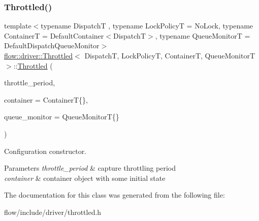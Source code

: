 \subsubsection{\texorpdfstring{Throttled()}{Throttled()}}
{\footnotesize\ttfamily template$<$typename DispatchT , typename Lock\+PolicyT  = No\+Lock, typename ContainerT  = Default\+Container$<$\+Dispatch\+T$>$, typename Queue\+MonitorT  = Default\+Dispatch\+Queue\+Monitor$>$ \\
\hyperlink{classflow_1_1driver_1_1_throttled}{flow\+::driver\+::\+Throttled}$<$ DispatchT, Lock\+PolicyT, ContainerT, Queue\+MonitorT $>$\+::\hyperlink{classflow_1_1driver_1_1_throttled}{Throttled} (\begin{DoxyParamCaption}\item[{const \hyperlink{classflow_1_1driver_1_1_throttled_abceda047ac43fa03ddfe00b68317ae3d}{offset\+\_\+type}}]{throttle\+\_\+period,  }\item[{const ContainerT \&}]{container = {\ttfamily ContainerT\{\}},  }\item[{const Queue\+MonitorT \&}]{queue\+\_\+monitor = {\ttfamily QueueMonitorT\{\}} }\end{DoxyParamCaption})\hspace{0.3cm}{\ttfamily [explicit]}}



Configuration constructor. 


\begin{DoxyParams}{Parameters}
{\em throttle\+\_\+period} & capture throttling period \\
\hline
{\em container} & container object with some initial state \\
\hline
\end{DoxyParams}


The documentation for this class was generated from the following file\+:\begin{DoxyCompactItemize}
\item 
flow/include/driver/throttled.\+h\end{DoxyCompactItemize}
